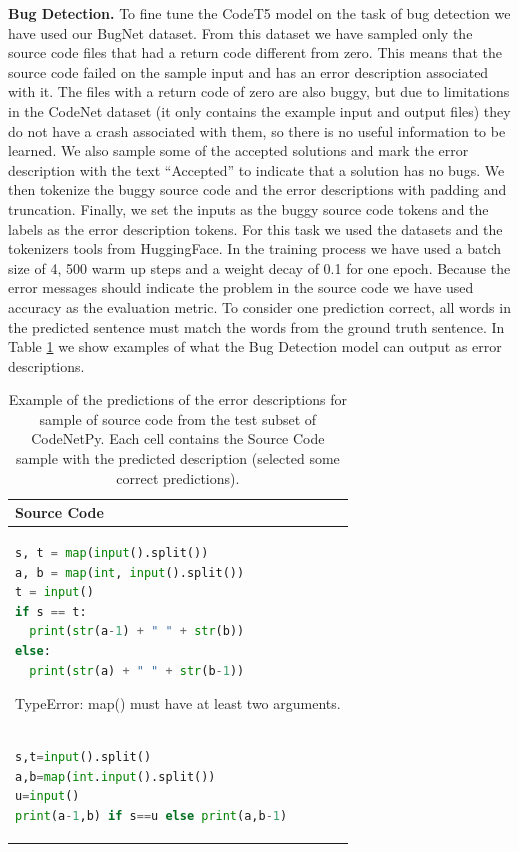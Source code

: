 \documentclass[12pt,a4paper]{report}
\begin{document}
\begin{appendices}
\textbf{Bug Detection.} To fine tune the CodeT5 model on the task of bug detection we have used our BugNet dataset. From this dataset we have sampled only the source code files that had a return code different from zero. This means that the source code failed on the sample input and has an error description associated with it. The files with a return code of zero are also buggy, but due to limitations in the CodeNet dataset (it only contains the example input and output files) they do not have a crash associated with them, so there is no useful information to be learned. We also sample some of the accepted solutions and mark the error description with the text “Accepted” to indicate that a solution has no bugs. We then tokenize the buggy source code and the error descriptions with padding and truncation. Finally, we set the inputs as the buggy source code tokens and the labels as the error description tokens. For this task we used the datasets and the tokenizers tools from HuggingFace. In the training process we have used a batch size of 4, 500 warm up steps and a weight decay of 0.1 for one epoch. Because the error messages should indicate the problem in the source code we have used accuracy as the evaluation metric. To consider one prediction correct, all words in the predicted sentence must match the words from the ground truth sentence. In Table \ref{tab:experiments12} we show examples of what the Bug Detection model can output as error descriptions.

\begin{table}[H]\small\linespread{1}
\centering
\caption{Example of the predictions of the error descriptions for sample of source code from the test subset of CodeNetPy. Each cell contains the Source Code sample with the predicted description (selected some correct predictions).}
\label{tab:experiments12}
\begin{tabular}{p{15cm}}
\textbf{Source Code} \\
\hline
\begin{lstlisting}[language=Python]
s, t = map(input().split())
a, b = map(int, input().split())
t = input()
if s == t:
  print(str(a-1) + " " + str(b))
else:
  print(str(a) + " " + str(b-1))
\end{lstlisting}

TypeError: map() must have at least two arguments.

\\

\hline
\begin{lstlisting}[language=Python]
s,t=input().split()
a,b=map(int.input().split())
u=input()
print(a-1,b) if s==u else print(a,b-1)
\end{lstlisting}


\end{tabular}
\end{table}
\end{appendices}
\end{document}
